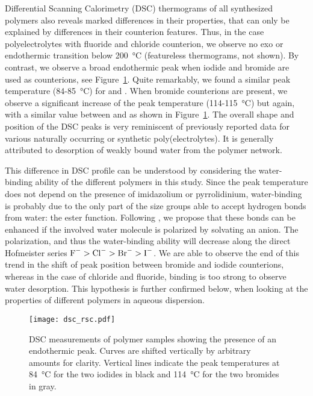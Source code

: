 \documentclass[twoside,twocolumn,9pt]{article}
\begin{document}
Differential Scanning Calorimetry (DSC) thermograms  of all synthesized polymers also reveals marked differences in their properties, that can only be explained by differences in their counterion features. Thus, in the case polyelectrolytes with fluoride and chloride counterion, we observe no exo or endothermic transition below \SI{200}{\celsius} (featureless thermograms, not shown). By contrast, we observe a broad endothermic peak when iodide and bromide are used as counterions, see Figure~\ref{fig:dsc}. Quite remarkably, we found a similar peak temperature (84-\SI{85}{\celsius}) for  and . When bromide counterions are present, we observe a significant increase of the peak temperature (114-\SI{115}{\celsius}) but again, with a similar value between  and  as shown in Figure~\ref{fig:dsc}. The overall shape and position of the DSC peaks is very reminiscent of previously reported data for various naturally occurring or synthetic poly(electrolytes)\cite{Li2005,Sarmento2006,Ostrowska-Czubenko2009a,Moin2015}. It is generally attributed to desorption of weakly bound water from the polymer network. %

This difference in DSC profile can be understood by considering the water-binding ability of the different polymers in this study. Since the peak temperature does not depend on the presence of imidazolium or pyrrolidinium, water-binding is probably due to the only part of the size groups able to accept hydrogen bonds from water: the ester function. Following \citet{Zhang2010a}, we propose that these bonds can be enhanced if the involved water molecule is polarized by solvating an anion. The polarization, and thus the water-binding ability will decrease along the direct Hofmeister series $\ce{F-}>\ce{Cl-}>\ce{Br-}>\ce{I-}$. We are able to observe the end of this trend in the shift of peak position between bromide and iodide counterions, whereas in the case of chloride and fluoride, binding is too strong to observe water desorption. This hypothesis is further confirmed below, when looking at the properties of different polymers in aqueous dispersion.

\begin{figure}
\texttt{[image: dsc\_rsc.pdf]}
\caption{DSC measurements of polymer samples showing the presence of an endothermic peak. Curves are shifted vertically by arbitrary amounts for clarity. Vertical lines indicate the peak temperatures at \SI{84}{\celsius} for the two iodides in black and \SI{114}{\celsius} for the two bromides in gray.}
\label{fig:dsc}
\end{figure}
\end{document}
